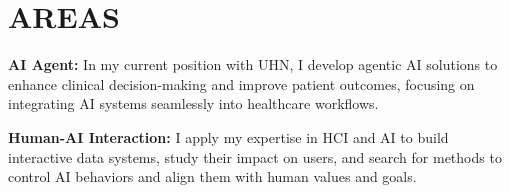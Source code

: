 \documentclass[letterpaper,11pt]{article}
\newcommand{\resumeSubHeadingListStart}{\begin{itemize}[leftmargin=0.0in, label={}]}
\newcommand{\resumeSubHeadingListEnd}{\end{itemize}}
\begin{document}
%

\vspace{-10pt}
\section{AREAS}
\textbf{\small{AI Agent}:} In my current position with UHN, I develop agentic AI solutions to enhance clinical decision-making and improve patient outcomes, focusing on integrating AI systems seamlessly into healthcare workflows.

\textbf{\small{Human-AI Interaction}:} I apply my expertise in HCI and AI to build interactive data systems, study their impact on users, and search for methods to control AI behaviors and align them with human values and goals.
\end{document}
